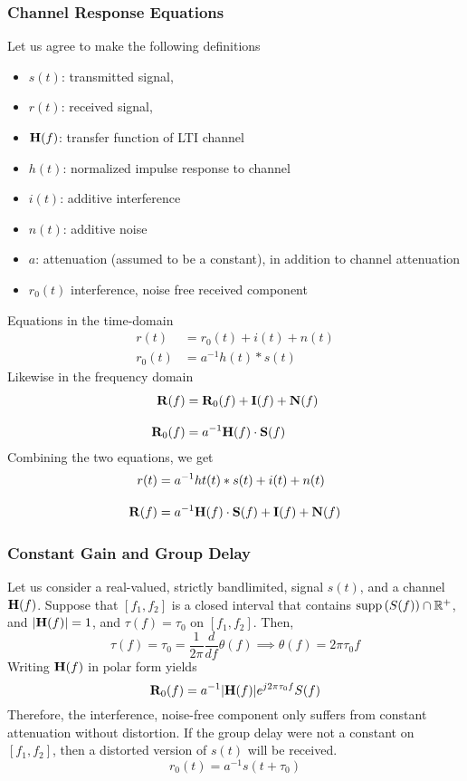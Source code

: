 \documentclass[../../main.tex]{subfiles}
\begin{document}
\subsubsection{Channel Response Equations}
Let us agree to make the following definitions
\begin{itemize}
    \item $s(t)$: transmitted signal,
    \item $r(t)$: received signal,
    \item $\mathbf{H}(f)$: transfer function of LTI channel
    \item $h(t)$: normalized impulse response to channel
    \item $i(t)$: additive interference
    \item $n(t)$: additive noise
    \item $a$: attenuation (assumed to be a constant), in addition to channel attenuation
    \item $r_0(t)$ interference, noise free received component
\end{itemize}
Equations in the time-domain
\begin{align}
    r(t) &= r_0(t) + i(t) + n(t)\\[2ex]
    r_0(t) &= a^{-1}h(t)\ast s(t)
\end{align}
Likewise in the frequency domain
\begin{align}
    \mathbf{R}(f) &= \mathbf{R}_0(f) + \mathbf{I}(f) + \mathbf{N}(f)\\[2ex]
    \mathbf{R}_0(f) &= a^{-1}\mathbf{H}(f)\cdot \mathbf{S}(f)
\end{align}
Combining the two equations, we get
\begin{align}
    r(t) &= a^{-1}ht(t)\ast s(t) + i(t) + n(t)\\[2ex]
    \mathbf{R}(f) &=a^{-1}\mathbf{H}(f)\cdot \mathbf{S}(f) + \mathbf{I}(f) + \mathbf{N}(f)
\end{align}
\subsubsection{Constant Gain and Group Delay}
Let us consider a real-valued, strictly bandlimited, signal $s(t)$, and a channel $\mathbf{H}(f)$. Suppose that $[f_1,f_2]$ is a closed interval that contains $\operatorname{supp}{(S(f))}\cap \mathbb{R}^+$, and $|\mathbf{H}(f)|=1$, and $\tau(f)=\tau_0$ on $[f_1,f_2]$. Then,
\[
\tau(f) = \tau_0 = \dfrac{1}{2\pi}\frac{d}{df}\theta(f)\implies \theta(f) = 2\pi\tau_0f
\]
Writing $\mathbf{H}(f)$ in polar form yields
\[
\mathbf{R}_0(f) = a^{-1}|\mathbf{H}(f)|e^{j2\pi\tau_0 f}S(f)
\]
Therefore, the interference, noise-free component only suffers from constant attenuation without distortion. If the group delay were not a constant on $[f_1,f_2]$, then a distorted version of $s(t)$ will be received.
\[
r_0(t) = a^{-1}s(t+\tau_0)
\]
\end{document}
